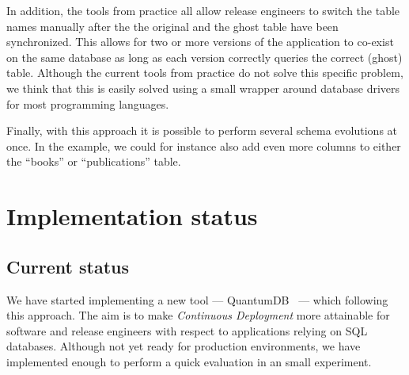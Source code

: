 \documentclass[conference]{IEEEtran}
\begin{document}
In addition, the tools from practice all allow release engineers to switch the table names manually after the the original and the ghost table have been synchronized. This allows for two or more versions of the application to co-exist on the same database as long as each version correctly queries the correct (ghost) table. Although the current tools from practice do not solve this specific problem, we think that this is easily solved using a small wrapper around database drivers for most programming languages.

Finally, with this approach it is possible to perform several schema evolutions at once. In the example, we could for instance also add even more columns to either the ``books'' or ``publications'' table.

\section{Implementation status} %

\subsection{Current status}

We have started implementing a new tool --- QuantumDB~\cite{QuantumDB} --- which following this approach. The aim is to make \textit{Continuous Deployment} more attainable for software and release engineers with respect to applications relying on SQL databases. Although not yet ready for production environments, we have implemented enough to perform a quick evaluation in an small experiment. 
\end{document}
